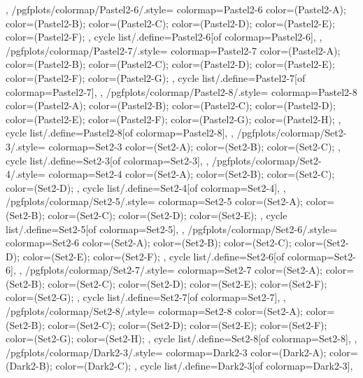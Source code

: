 {{  },
  /pgfplots/colormap/Pastel2-6/.style={
    colormap={Pastel2-6}{
      color=(Pastel2-A);
      color=(Pastel2-B);
      color=(Pastel2-C);
      color=(Pastel2-D);
      color=(Pastel2-E);
      color=(Pastel2-F);
    },
    cycle list/.define={Pastel2-6}{[of colormap=Pastel2-6]},
  },
  /pgfplots/colormap/Pastel2-7/.style={
    colormap={Pastel2-7}{
      color=(Pastel2-A);
      color=(Pastel2-B);
      color=(Pastel2-C);
      color=(Pastel2-D);
      color=(Pastel2-E);
      color=(Pastel2-F);
      color=(Pastel2-G);
    },
    cycle list/.define={Pastel2-7}{[of colormap=Pastel2-7]},
  },
  /pgfplots/colormap/Pastel2-8/.style={
    colormap={Pastel2-8}{
      color=(Pastel2-A);
      color=(Pastel2-B);
      color=(Pastel2-C);
      color=(Pastel2-D);
      color=(Pastel2-E);
      color=(Pastel2-F);
      color=(Pastel2-G);
      color=(Pastel2-H);
    },
    cycle list/.define={Pastel2-8}{[of colormap=Pastel2-8]},
  },
  /pgfplots/colormap/Set2-3/.style={
    colormap={Set2-3}{
      color=(Set2-A);
      color=(Set2-B);
      color=(Set2-C);
    },
    cycle list/.define={Set2-3}{[of colormap=Set2-3]},
  },
  /pgfplots/colormap/Set2-4/.style={
    colormap={Set2-4}{
      color=(Set2-A);
      color=(Set2-B);
      color=(Set2-C);
      color=(Set2-D);
    },
    cycle list/.define={Set2-4}{[of colormap=Set2-4]},
  },
  /pgfplots/colormap/Set2-5/.style={
    colormap={Set2-5}{
      color=(Set2-A);
      color=(Set2-B);
      color=(Set2-C);
      color=(Set2-D);
      color=(Set2-E);
    },
    cycle list/.define={Set2-5}{[of colormap=Set2-5]},
  },
  /pgfplots/colormap/Set2-6/.style={
    colormap={Set2-6}{
      color=(Set2-A);
      color=(Set2-B);
      color=(Set2-C);
      color=(Set2-D);
      color=(Set2-E);
      color=(Set2-F);
    },
    cycle list/.define={Set2-6}{[of colormap=Set2-6]},
  },
  /pgfplots/colormap/Set2-7/.style={
    colormap={Set2-7}{
      color=(Set2-A);
      color=(Set2-B);
      color=(Set2-C);
      color=(Set2-D);
      color=(Set2-E);
      color=(Set2-F);
      color=(Set2-G);
    },
    cycle list/.define={Set2-7}{[of colormap=Set2-7]},
  },
  /pgfplots/colormap/Set2-8/.style={
    colormap={Set2-8}{
      color=(Set2-A);
      color=(Set2-B);
      color=(Set2-C);
      color=(Set2-D);
      color=(Set2-E);
      color=(Set2-F);
      color=(Set2-G);
      color=(Set2-H);
    },
    cycle list/.define={Set2-8}{[of colormap=Set2-8]},
  },
  /pgfplots/colormap/Dark2-3/.style={
    colormap={Dark2-3}{
      color=(Dark2-A);
      color=(Dark2-B);
      color=(Dark2-C);
    },
    cycle list/.define={Dark2-3}{[of colormap=Dark2-3]},
}}
